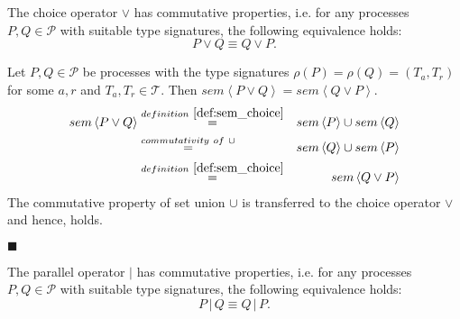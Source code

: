 \begin{theorem}
\label{thm:commutativity_choice}
The choice operator $\vee$ has commutative properties, i.e. for any processes $P, Q \in \mathcal{P}$ with suitable type signatures, the following equivalence holds:
\begin{equation*}
  P \vee Q \equiv Q \vee P.
\end{equation*}
\end{theorem}

\begin{myproof}
Let $P, Q \in \mathcal{P}$ be processes with the type signatures $\rho \left( P \right) = \rho \left( Q \right) = \left( T_a, T_r \right)$ for some $a, r$ and $T_a, T_r \in \mathcal{T}$. Then $sem \left\langle P \vee Q \right\rangle = sem \left\langle Q \vee P \right\rangle$.
\begin{eqnarray*}
  sem \left\langle P \vee Q \right\rangle & \overset{\defref{def:sem_choice}}{=} & sem \left\langle P \right\rangle \cup sem \left\langle Q \right\rangle \\
  & \overset{commutativity \ of \ \cup}{=} & sem \left\langle Q \right\rangle \cup sem \left\langle P \right\rangle \\
  & \overset{\defref{def:sem_choice}}{=} & sem \left\langle Q \vee P \right\rangle
\end{eqnarray*}
The commutative property of set union $\cup$ is transferred to the choice operator $\vee$ and hence,  holds.

\hfill$\blacksquare$
\end{myproof}

\begin{theorem}
\label{thm:commutativity_parallel}
The parallel operator $|$ has commutative properties, i.e. for any processes $P, Q \in \mathcal{P}$ with suitable type signatures, the following equivalence holds:
\begin{equation*}
  P \,|\, Q \equiv Q \,|\, P.
\end{equation*}
\end{theorem}

